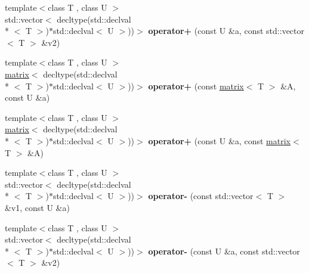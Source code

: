 \begin{DoxyCompactItemize}
\item 
\hypertarget{namespacekeycpp_ad4df2f7feaefed6813ecfe11e37087ab}{{\footnotesize template$<$class T , class U $>$ }\\std\-::vector$<$ decltype(std\-::declval\\*
$<$ T $>$)$\ast$std\-::declval$<$ U $>$))$>$ {\bfseries operator+} (const U \&a, const std\-::vector$<$ T $>$ \&v2)}\label{namespacekeycpp_ad4df2f7feaefed6813ecfe11e37087ab}

\item 
\hypertarget{namespacekeycpp_adff86e062c6497110b7505b0ef715c2c}{{\footnotesize template$<$class T , class U $>$ }\\\hyperlink{classkeycpp_1_1matrix}{matrix}$<$ decltype(std\-::declval\\*
$<$ T $>$)$\ast$std\-::declval$<$ U $>$))$>$ {\bfseries operator+} (const \hyperlink{classkeycpp_1_1matrix}{matrix}$<$ T $>$ \&A, const U \&a)}\label{namespacekeycpp_adff86e062c6497110b7505b0ef715c2c}

\item 
\hypertarget{namespacekeycpp_a4b4a64905c9d681c174b2dfcfba272c4}{{\footnotesize template$<$class T , class U $>$ }\\\hyperlink{classkeycpp_1_1matrix}{matrix}$<$ decltype(std\-::declval\\*
$<$ T $>$)$\ast$std\-::declval$<$ U $>$))$>$ {\bfseries operator+} (const U \&a, const \hyperlink{classkeycpp_1_1matrix}{matrix}$<$ T $>$ \&A)}\label{namespacekeycpp_a4b4a64905c9d681c174b2dfcfba272c4}

\item 
\hypertarget{namespacekeycpp_af66a177fcb4f0ec1f260fdb39069fc29}{{\footnotesize template$<$class T , class U $>$ }\\std\-::vector$<$ decltype(std\-::declval\\*
$<$ T $>$)$\ast$std\-::declval$<$ U $>$))$>$ {\bfseries operator-\/} (const std\-::vector$<$ T $>$ \&v1, const U \&a)}\label{namespacekeycpp_af66a177fcb4f0ec1f260fdb39069fc29}

\item 
\hypertarget{namespacekeycpp_a9a99d5b9548a160a11ed713b85038871}{{\footnotesize template$<$class T , class U $>$ }\\std\-::vector$<$ decltype(std\-::declval\\*
$<$ T $>$)$\ast$std\-::declval$<$ U $>$))$>$ {\bfseries operator-\/} (const U \&a, const std\-::vector$<$ T $>$ \&v2)}\label{namespacekeycpp_a9a99d5b9548a160a11ed713b85038871}


\end{DoxyCompactItemize}

